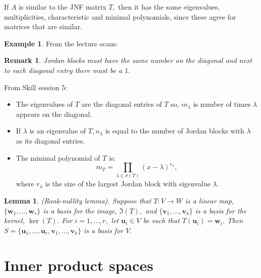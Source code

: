\documentclass[12pt, a4paper]{article}
\newtheorem*{remark}{Remark}
\theoremstyle{definition}
\newtheorem*{example}{Example}
\theoremstyle{plain}
\newtheorem{lemma}[theorem]{Lemma}
\begin{document}
If $A$ is similar to the JNF matrix $T,$ then it has the same eigenvalues, multiplicities, characteristic and minimal polynomials, since these agree for matrices that are similar.

\begin{example}
From the lecture scans:
\begin{landscape}


\end{landscape}
\end{example}

\begin{remark}
Jordan blocks must have the same number on the diagonal and next to each diagonal entry there must be a $1.$
\end{remark}

\begin{tcolorbox}
From Skill session 5:
\begin{itemize}

	\item The eigenvalues of $T$ are the diagonal entries of $T$ so, $m_\lambda$ is number of times $\lambda$ appears on the diagonal.   

	\item If $\lambda$ is an eigenvalue of $T, n_\lambda$ is equal to the number of Jordan blocks with $\lambda$ as its diagonal entries.

	\item The minimal polynomial of $T$ is: $$m_T=\prod_{\lambda \in \sigma(T)}(x-\lambda)^{r_\lambda},$$ where $r_\lambda$ is the size of the largest Jordan block with eigenvalue $\lambda.$

\end{itemize}
\end{tcolorbox}

\begin{lemma}
(Rank-nullity lemma). Suppose that $T : V \to W$ is a linear map, $\{\mathbf{w}_1,\ldots,\mathbf{w}_r\}$ is a basis for the image, $\Im(T),$ and $\{\mathbf{v}_1,\ldots,\mathbf{v}_k\}$ is a basis for the kernel, $\ker(T).$ For $i = 1,...,r,$ let $\mathbf{u}_i \in V$ be such that $T(\mathbf{u}_i) = \mathbf{w}_i.$ Then $S = \{\mathbf{u}_1,\ldots,\mathbf{u}_r,\mathbf{v}_1,\ldots,\mathbf{v}_k\}$ is a basis for $V.$
\end{lemma}

\section{Inner product spaces}
\end{document}
